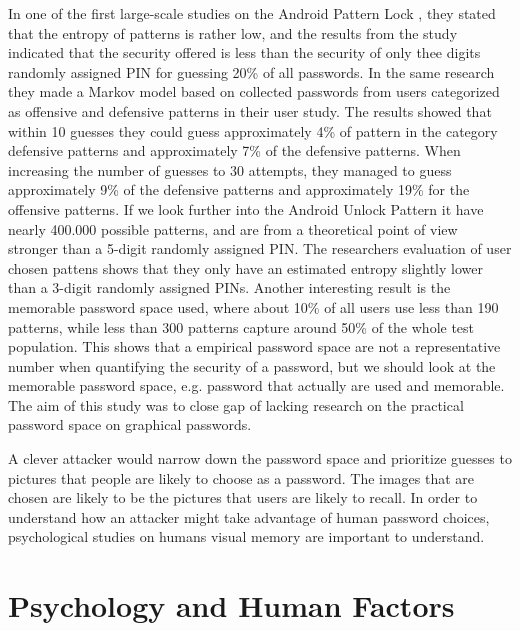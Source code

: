   In one of the first large-scale studies on the Android Pattern Lock \cite{Uellenbeck}, they stated that the entropy of patterns is rather low, and the results from the study indicated that the security offered is less than the security of only thee digits randomly assigned PIN for guessing 20\% of all passwords. In the same research they made a Markov model based on collected passwords from users categorized as offensive and defensive patterns in their user study. The results showed that within 10 guesses they could guess approximately 4\% of pattern in the category defensive patterns and approximately 7\% of the defensive patterns. When increasing the number of guesses to 30 attempts, they managed to guess approximately 9\% of the defensive patterns and approximately 19\% for the offensive patterns. If we look further into the Android Unlock Pattern it have nearly 400.000 possible patterns, and are from a theoretical point of view stronger than a 5-digit randomly assigned PIN. The researchers evaluation of user chosen pattens shows that they only have an estimated entropy slightly lower than a 3-digit randomly assigned PINs. Another interesting result is the memorable password space used, where about 10\% of all users use less than 190 patterns, while less than 300 patterns capture around 50\% of the whole test population. This shows that a empirical password space are not a representative number when quantifying the security of a password, but we should look at the memorable password space, e.g. password that actually are used and memorable. The aim of this study was to close gap of lacking research on the practical password space on graphical passwords. 

  A clever attacker would narrow down the password space and prioritize guesses to pictures that people are likely to choose as a password. The images that are chosen are likely to be the pictures that users are likely to recall. In order to understand how an attacker might take advantage of human password choices, psychological studies on humans visual memory are important to understand. 

\clearpage
\section{Psychology and Human Factors}

